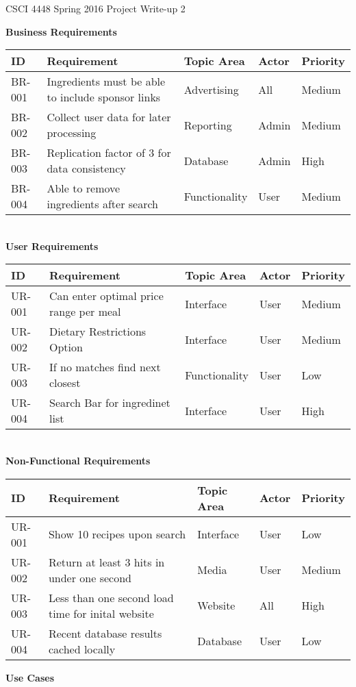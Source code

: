 \documentclass[12pt]{article}
\begin{document}
CSCI 4448 Spring 2016 \hfill Project Write-up 2\\

\hrulefill
\begin{center}
  \textbf{Business Requirements} \\
\begin{tabular}{| l | l | l | l | l | }
  \hline
  \textbf{ID}  & \textbf{Requirement} & \textbf{Topic Area} & \textbf{Actor} & \textbf{Priority} \\ \hline
  BR-001 & Ingredients must be able to include sponsor links & Advertising & All & Medium \\ \hline 
  BR-002 & Collect user data for later processing & Reporting & Admin & Medium \\ \hline
  BR-003 & Replication factor of 3 for data consistency & Database & Admin & High \\ \hline
  BR-004 & Able to remove ingredients after search & Functionality & User & Medium \\ \hline

\end{tabular}
\\
  \vspace{1cm}
 \textbf{User Requirements} \\
\begin{tabular}{| l | l | l | l | l | }
  \hline
  \textbf{ID}  & \textbf{Requirement} & \textbf{Topic Area} & \textbf{Actor} & \textbf{Priority} \\ \hline
  UR-001 & Can enter optimal price range per meal & Interface & User & Medium \\ \hline 
  UR-002 & Dietary Restrictions Option  & Interface & User & Medium \\ \hline
  UR-003 & If no matches find next closest & Functionality & User & Low \\ \hline
  UR-004 & Search Bar for ingredinet list & Interface & User & High \\ \hline
\end{tabular}
\\
  \vspace{1cm}
  \textbf{Non-Functional Requirements}
\begin{tabular}{| l | l | l | l | l | }
  \hline
  \textbf{ID}  & \textbf{Requirement} & \textbf{Topic Area} & \textbf{Actor} & \textbf{Priority} \\ \hline
  UR-001 & Show 10 recipes upon search  &  Interface & User & Low  \\ \hline 
  UR-002 & Return at least 3 hits in under one second & Media & User &  Medium\\ \hline
  UR-003 & Less than one second load time for inital website &  Website & All & High \\ \hline
  UR-004 & Recent database results cached locally & Database & User & Low \\ \hline
\end{tabular}
\end{center}
\newpage
\begin{center}
\textbf{Use Cases}
\end{center}
\end{document}
